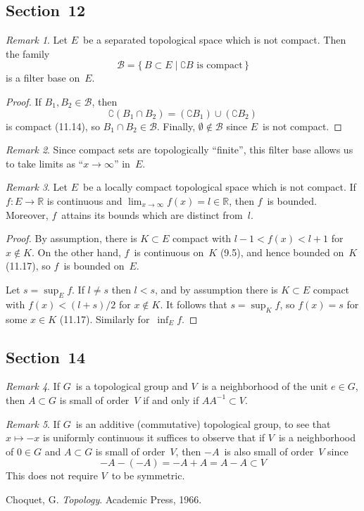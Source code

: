 \documentclass[letterpaper,12pt]{article}
\newcommand{\R}{\mathbb{R}}
\newcommand{\B}{\mathcal{B}}
\newcommand{\union}{\cup}
\newcommand{\sect}{\cap}
\newcommand{\inv}[1]{#1^{-1}}
\theoremstyle{definition}
\theoremstyle{remark}
\newtheorem*{rmk}{Remark}
\begin{document}
\subsection*{Section~12}
\begin{rmk}
Let \(E\)~be a separated topological space which is not compact. Then the family
\[\B=\{\,B\subset E\mid\complement B\text{ is compact}\,\}\]
is a filter base on~\(E\).
\end{rmk}
\begin{proof}
If \(B_1,B_2\in\B\), then
\[\complement(B_1\sect B_2)=(\complement B_1)\union(\complement B_2)\]
is compact (11.14), so \(B_1\sect B_2\in\B\). Finally, \(\emptyset\not\in\B\) since \(E\)~is not compact.
\end{proof}
\begin{rmk}
Since compact sets are topologically ``finite'', this filter base allows us to take limits as ``\(x\to\infty\)'' in~\(E\).
\end{rmk}

\begin{rmk}
Let \(E\)~be a locally compact topological space which is not compact. If \(f:E\to\R\) is continuous and \(\lim_{x\to\infty}f(x)=l\in\R\), then \(f\)~is bounded. Moreover, \(f\)~attains its bounds which are distinct from~\(l\).
\end{rmk}
\begin{proof}
By assumption, there is \(K\subset E\) compact with \(l-1<f(x)<l+1\) for \(x\not\in K\). On the other hand, \(f\)~is continuous on~\(K\) (9.5), and hence bounded on~\(K\) (11.17), so \(f\)~is bounded on~\(E\).

Let \(s=\sup_E f\). If \(l\ne s\) then \(l<s\), and by assumption there is \(K\subset E\) compact with \(f(x)<(l+s)/2\) for \(x\not\in K\). It follows that \(s=\sup_K f\), so \(f(x)=s\) for some \(x\in K\) (11.17). Similarly for~\(\inf_E f\).
\end{proof}

\subsection*{Section~14}
\begin{rmk}
If \(G\)~is a topological group and \(V\)~is a neighborhood of the unit \(e\in G\), then \(A\subset G\) is small of order~\(V\) if and only if \(A\inv{A}\subset V\).
\end{rmk}

\begin{rmk}
If \(G\)~is an additive (commutative) topological group, to see that \(x\mapsto -x\) is uniformly continuous it suffices to observe that if \(V\)~is a neighborhood of \(0\in G\) and \(A\subset G\) is small of order~\(V\), then \(-A\)~is also small of order~\(V\) since
\[-A-(-A)=-A+A=A-A\subset V\]
This does not require \(V\)~to be symmetric.
\end{rmk}

\newpage
\begin{thebibliography}{0}
 Choquet, G. \textit{Topology}. Academic Press, 1966.
\end{thebibliography}
\end{document}
